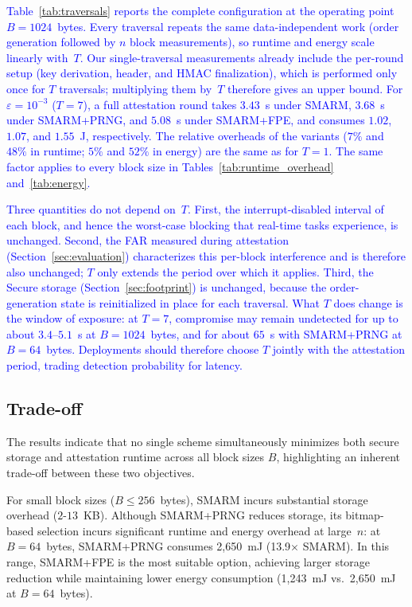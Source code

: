 \documentclass[journal]{IEEEtran}
\newcommand\ben[1]{\textcolor{blue}{#1}}
\newcommand{\rtsmarmone}{SMARM+PRNG\xspace}
\newcommand{\rtsmarmtwo}{SMARM+FPE\xspace}
\begin{document}
\ben{Table~\ref{tab:traversals} reports the complete configuration at the operating point $B = 1024$~bytes.
Every traversal repeats the same data-independent work (order generation followed by $n$ block measurements), so runtime and energy scale linearly with~$T$.
Our single-traversal measurements already include the per-round setup (key derivation, header, and HMAC finalization), which is performed only once for $T$ traversals; multiplying them by~$T$ therefore gives an upper bound.
For $\varepsilon = 10^{-3}$ ($T = 7$), a full attestation round takes $3.43$~s under SMARM, $3.68$~s under \rtsmarmone, and $5.08$~s under \rtsmarmtwo, and consumes $1.02$, $1.07$, and $1.55$~J, respectively.
The relative overheads of the variants ($7\%$ and $48\%$ in runtime; $5\%$ and $52\%$ in energy) are the same as for $T = 1$.
The same factor applies to every block size in Tables~\ref{tab:runtime_overhead} and~\ref{tab:energy}.}

\ben{Three quantities do not depend on~$T$.
First, the interrupt-disabled interval of each block, and hence the worst-case blocking that real-time tasks experience, is unchanged.
Second, the FAR measured during attestation (Section~\ref{sec:evaluation}) characterizes this per-block interference and is therefore also unchanged; $T$ only extends the period over which it applies.
Third, the Secure storage (Section~\ref{sec:footprint}) is unchanged, because the order-generation state is reinitialized in place for each traversal.
What $T$ does change is the window of exposure: at $T = 7$, compromise may remain undetected for up to about $3.4$--$5.1$~s at $B = 1024$~bytes, and for about $65$~s with \rtsmarmone at $B = 64$~bytes.
Deployments should therefore choose $T$ jointly with the attestation period, trading detection probability for latency.}


\subsection{Trade-off}
The results indicate that no single scheme simultaneously minimizes both secure storage and attestation runtime across all block sizes $B$, highlighting an inherent trade-off between these two objectives.

For small block sizes ($B \leq 256$~bytes), SMARM incurs 
substantial storage overhead ($2$-$13$~KB). Although 
\rtsmarmone reduces storage, its bitmap-based selection 
incurs significant runtime and energy overhead at large~$n$: 
at $B = 64$~bytes, \rtsmarmone consumes 2{,}650~mJ 
(13.9$\times$ SMARM). In this range, \rtsmarmtwo is the 
most suitable option, achieving larger storage reduction 
while maintaining lower energy consumption (1{,}243~mJ 
vs.\ 2{,}650~mJ at $B = 64$~bytes).
\end{document}
